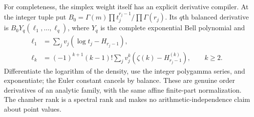 For completeness, the simplex weight itself has an explicit derivative
compiler. At the integer tuple put
$B_0=\Gamma(m)\prod t_j^{r_j-1}/\prod\Gamma(r_j)$. Its $q$th balanced
derivative is $B_0Y_q(\ell_1,\ldots,\ell_q)$, where $Y_q$ is the complete
exponential Bell polynomial and
\begin{align*}
 \ell_1&=\sum_jv_j(\log t_j-H_{r_j-1}),\\
 \ell_k&=(-1)^{k+1}(k-1)!\sum_jv_j^k
                  (\zeta(k)-H_{r_j-1}^{(k)}),\qquad k\ge2.
\end{align*}
Differentiate the logarithm of the density, use the integer polygamma
series, and exponentiate; the Euler constant cancels by balance.
These are genuine order derivatives of an analytic family, with the
same affine finite-part normalization. The chamber rank is a spectral
rank and makes no arithmetic-independence claim about point values.

